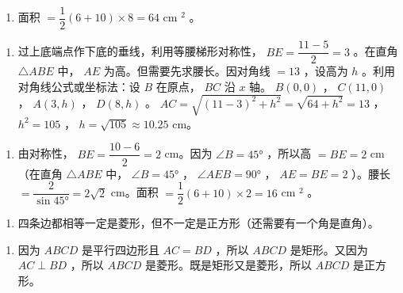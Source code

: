 \begin{answer}
\begin{enumerate}
  \item 面积 $= \dfrac{1}{2}(6 + 10) \times 8 = 64$ cm $^2$ 。
\end{enumerate}


\begin{enumerate}
  \item 过上底端点作下底的垂线，利用等腰梯形对称性， $BE = \dfrac{11 - 5}{2} = 3$ 。在直角 $\triangle ABE$ 中， $AE$ 为高。但需要先求腰长。因对角线 $= 13$ ，设高为 $h$ 。利用对角线公式或坐标法：设 $B$ 在原点， $BC$ 沿 $x$ 轴。 $B(0,0)$ ， $C(11,0)$ ， $A(3,h)$ ， $D(8,h)$ 。 $AC = \sqrt{(11-3)^2 + h^2} = \sqrt{64 + h^2} = 13$ ， $h^2 = 105$ ， $h = \sqrt{105} \approx 10.25$ cm。
\end{enumerate}


\begin{enumerate}
  \item 由对称性， $BE = \dfrac{10-6}{2} = 2$ cm。因为 $\angle B = 45°$ ，所以高 $= BE = 2$ cm（在直角 $\triangle ABE$ 中， $\angle B = 45°$ ， $\angle AEB = 90°$ ， $AE = BE = 2$ ）。腰长 $= \dfrac{2}{\sin 45°} = 2\sqrt{2}$ cm。面积 $= \dfrac{1}{2}(6+10) \times 2 = 16$ cm $^2$ 。
\end{enumerate}


\begin{enumerate}
  \item 四条边都相等一定是菱形，但不一定是正方形（还需要有一个角是直角）。
\end{enumerate}


\begin{enumerate}
  \item 因为 $ABCD$ 是平行四边形且 $AC = BD$ ，所以 $ABCD$ 是矩形。又因为 $AC \perp BD$ ，所以 $ABCD$ 是菱形。既是矩形又是菱形，所以 $ABCD$ 是正方形。
\end{enumerate}


\end{answer}

